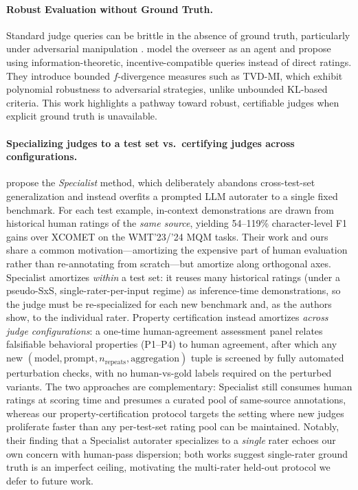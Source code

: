 \documentclass[numbers]{article}
\begin{document}
\paragraph{Robust Evaluation without Ground Truth.}
Standard judge queries can be brittle in the absence of ground truth, particularly under adversarial manipulation \citep{Zhuo2024ICEScore,TongZhang2024CodeJudge}. \citet{robertson2025stepbystep} model the overseer as an agent and propose using information-theoretic, incentive-compatible queries instead of direct ratings. They introduce bounded $f$-divergence measures such as TVD-MI, which exhibit polynomial robustness to adversarial strategies, unlike unbounded KL-based criteria. This work highlights a pathway toward robust, certifiable judges when explicit ground truth is unavailable.

\paragraph{Specializing judges to a test set vs.\ certifying judges across configurations.}
\citet{finkelstein2024specialist} propose the \emph{Specialist} method, which deliberately abandons cross-test-set generalization and instead overfits a prompted LLM autorater to a single fixed benchmark.
For each test example, in-context demonstrations are drawn from historical human ratings of the \emph{same source}, yielding 54--119\% character-level F1 gains over \textsc{XCOMET} on the WMT'23/'24 MQM tasks.
Their work and ours share a common motivation---amortizing the expensive part of human evaluation rather than re-annotating from scratch---but amortize along orthogonal axes.
Specialist amortizes \emph{within} a test set: it reuses many historical ratings (under a pseudo-SxS, single-rater-per-input regime) as inference-time demonstrations, so the judge must be re-specialized for each new benchmark and, as the authors show, to the individual rater.
Property certification instead amortizes \emph{across judge configurations}: a one-time human-agreement assessment panel relates falsifiable behavioral properties (P1--P4) to human agreement, after which any new $(\text{model},\text{prompt},n_\text{repeats},\text{aggregation})$ tuple is screened by fully automated perturbation checks, with no human-vs-gold labels required on the perturbed variants.
The two approaches are complementary: Specialist still consumes human ratings at scoring time and presumes a curated pool of same-source annotations, whereas our property-certification protocol targets the setting where new judges proliferate faster than any per-test-set rating pool can be maintained.
Notably, their finding that a Specialist autorater specializes to a \emph{single} rater echoes our own concern with human-pass dispersion; both works suggest single-rater ground truth is an imperfect ceiling, motivating the multi-rater held-out protocol we defer to future work.
\end{document}
